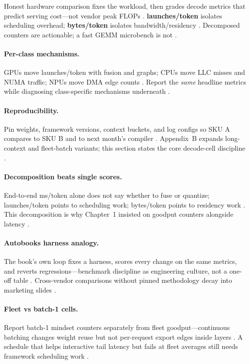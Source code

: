 Honest hardware comparison fixes the workload, then grades decode metrics that predict serving cost---not vendor peak FLOPs \citep{taxbreak2026,memoryfloor2026,patel2025llminference}.
\textbf{launches/token} isolates scheduling overhead; \textbf{bytes/token} isolates bandwidth/residency \citep{kwon2023vllm}.
Decomposed counters are actionable; a fast GEMM microbench is not \citep{memoryfloor2026}.

\paragraph{Per-class mechanisms.}
GPUs move launches/token with fusion and graphs; CPUs move LLC misses and NUMA traffic; NPUs move DMA edge counts \citep{nvidia2022hopper,amd2024aie,dlbook}.
Report the \emph{same} headline metrics while diagnosing class-specific mechanisms underneath \citep{taxbreak2026}.

\paragraph{Reproducibility.}
Pin weights, framework versions, context buckets, and log configs so SKU A compares to SKU B and to next month's compiler \citep{memoryfloor2026,yirage2026}.
Appendix~B expands long-context and fleet-batch variants; this section states the core decode-cell discipline \citep{kwon2023vllm}.

\paragraph{Decomposition beats single scores.}
End-to-end ms/token alone does not say whether to fuse or quantize; launches/token points to scheduling work; bytes/token points to residency work \citep{taxbreak2026,memoryfloor2026}.
This decomposition is why Chapter~1 insisted on goodput counters alongside latency \citep{patel2025llminference,kwon2023vllm}.

\paragraph{Autobooks harness analogy.}
The book's own loop fixes a harness, scores every change on the same metrics, and reverts regressions---benchmark discipline as engineering culture, not a one-off table \citep{yirage2026,taxbreak2026}.
Cross-vendor comparisons without pinned methodology decay into marketing slides \citep{memoryfloor2026}.

\paragraph{Fleet vs batch-1 cells.}
Report batch-1 mindset counters separately from fleet goodput---continuous batching changes weight reuse but not per-request export edges inside layers \citep{kwon2023vllm,patel2025llminference}.
A schedule that helps interactive tail latency but fails at fleet averages still needs framework scheduling work \citep{memoryfloor2026,taxbreak2026}.

